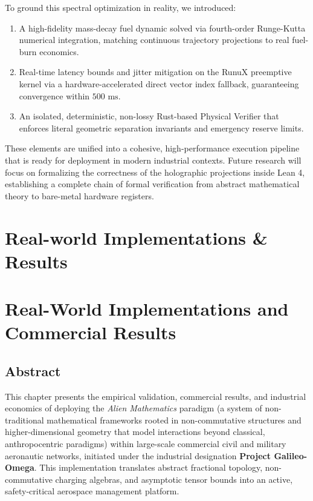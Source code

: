 \documentclass[11pt,a4paper]{book}
\begin{document}
To ground this spectral optimization in reality, we introduced:
\begin{enumerate}
\item A high-fidelity mass-decay fuel dynamic solved via fourth-order Runge-Kutta numerical integration, matching continuous trajectory projections to real fuel-burn economics.
\item Real-time latency bounds and jitter mitigation on the RunuX preemptive kernel via a hardware-accelerated direct vector index fallback, guaranteeing convergence within $500\text{ ms}$.
\item An isolated, deterministic, non-lossy Rust-based Physical Verifier that enforces literal geometric separation invariants and emergency reserve limits.
\end{enumerate}

These elements are unified into a cohesive, high-performance execution pipeline that is ready for deployment in modern industrial contexts. Future research will focus on formalizing the correctness of the holographic projections inside Lean 4, establishing a complete chain of formal verification from abstract mathematical theory to bare-metal hardware registers.

\chapter{Real-world Implementations \& Results}
\chapter{Real-World Implementations and Commercial Results}\label{ch:real_world_implementations_results}

\section*{Abstract}
This chapter presents the empirical validation, commercial results, and industrial economics of deploying the \textit{Alien Mathematics} paradigm (a system of non-traditional mathematical frameworks rooted in non-commutative structures and higher-dimensional geometry that model interactions beyond classical, anthropocentric paradigms) within large-scale commercial civil and military aeronautic networks, initiated under the industrial designation \textbf{Project Galileo-Omega}. This implementation translates abstract fractional topology, non-commutative charging algebras, and asymptotic tensor bounds into an active, safety-critical aerospace management platform.
\end{document}
